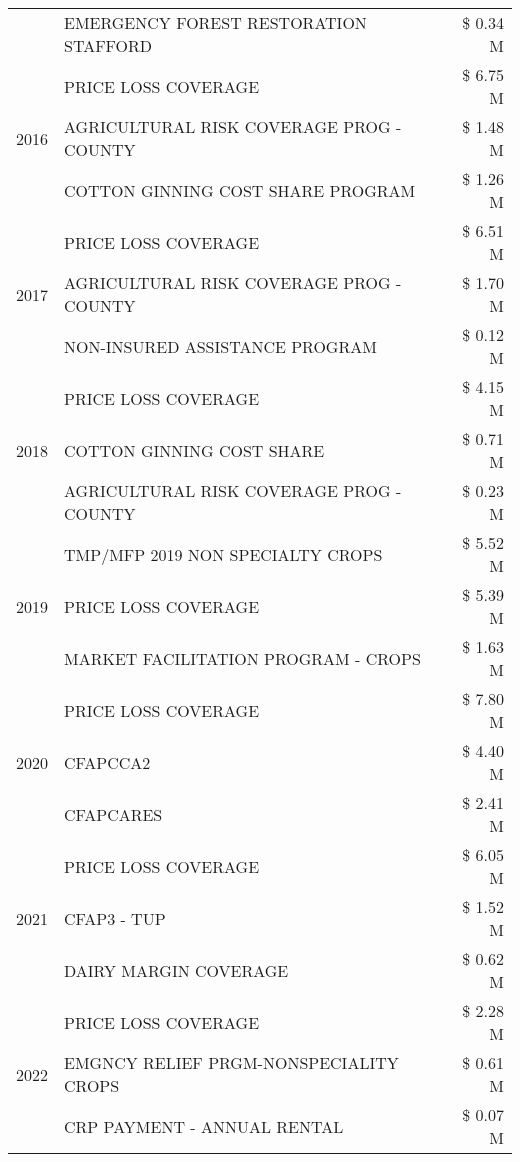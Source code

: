\begin{tabular}{llr}
 & EMERGENCY FOREST RESTORATION STAFFORD & \$ 0.34 M \\
\cline{1-3}
\multirow[t]{3}{*}{2016} & PRICE LOSS COVERAGE & \$ 6.75 M \\
 & AGRICULTURAL RISK COVERAGE PROG - COUNTY & \$ 1.48 M \\
 & COTTON GINNING COST SHARE PROGRAM & \$ 1.26 M \\
\cline{1-3}
\multirow[t]{3}{*}{2017} & PRICE LOSS COVERAGE & \$ 6.51 M \\
 & AGRICULTURAL RISK COVERAGE PROG - COUNTY & \$ 1.70 M \\
 & NON-INSURED ASSISTANCE PROGRAM & \$ 0.12 M \\
\cline{1-3}
\multirow[t]{3}{*}{2018} & PRICE LOSS COVERAGE & \$ 4.15 M \\
 & COTTON GINNING COST SHARE & \$ 0.71 M \\
 & AGRICULTURAL RISK COVERAGE PROG - COUNTY & \$ 0.23 M \\
\cline{1-3}
\multirow[t]{3}{*}{2019} & TMP/MFP 2019 NON SPECIALTY CROPS & \$ 5.52 M \\
 & PRICE LOSS COVERAGE & \$ 5.39 M \\
 & MARKET FACILITATION PROGRAM - CROPS & \$ 1.63 M \\
\cline{1-3}
\multirow[t]{3}{*}{2020} & PRICE LOSS COVERAGE & \$ 7.80 M \\
 & CFAPCCA2 & \$ 4.40 M \\
 & CFAPCARES & \$ 2.41 M \\
\cline{1-3}
\multirow[t]{3}{*}{2021} & PRICE LOSS COVERAGE & \$ 6.05 M \\
 & CFAP3 - TUP & \$ 1.52 M \\
 & DAIRY MARGIN COVERAGE & \$ 0.62 M \\
\cline{1-3}
\multirow[t]{3}{*}{2022} & PRICE LOSS COVERAGE & \$ 2.28 M \\
 & EMGNCY RELIEF PRGM-NONSPECIALITY CROPS & \$ 0.61 M \\
 & CRP PAYMENT - ANNUAL RENTAL & \$ 0.07 M \\
\cline{1-3}
\bottomrule
\end{tabular}
